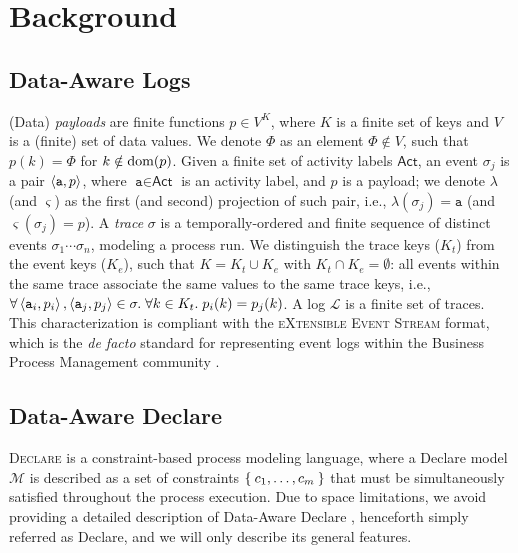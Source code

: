 \section{Background}

\subsection{Data-Aware Logs}
(Data) \textit{payloads} are finite functions $p\in V^K$, where $K$ is a finite set of keys and $V$ is a (finite) set of data values. We denote $\varPhi$ as an element $\varPhi\notin V$, such that $p(k)=\varPhi$ for $k\notin\textup{dom}(p)$. Given a finite set of activity labels $\textsf{Act}$, an event $\sigma_j$ is a pair $\Braket{\texttt{a},p}$, where $\texttt{a}\in\textsf{Act}$ is an activity label, and $p$ is a payload; we denote $\lambda$ (and $\varsigma$) as the first (and second) projection of such pair, i.e., $\lambda(\sigma_j)=\texttt{a}$ (and $\varsigma(\sigma_j)=p$). A \textit{trace} $\sigma$ is a temporally-ordered and finite sequence of distinct events $\sigma_1\cdots\sigma_n$, modeling a process run. We distinguish the trace keys ($K_t$) from the event keys ($K_e$), such that $K=K_t\cup K_e$ with $K_t\cap K_e=\emptyset$: all events within the same trace associate the same values to the same trace keys, i.e., $\forall \Braket{\texttt{a}_i,p_i},\Braket{\texttt{a}_j,p_j}\in\sigma.\;\forall k\in K_t.\; p_i(k)=p_j(k)$. A log $\mathcal{L}$ is a finite set of traces. This  characterization is compliant with the \textsc{eXtensible Event Stream} format, which is the \textit{de facto} standard for representing event logs within the Business Process Management community \cite{SchonigCMM16,LenoDM18}.


\subsection{Data-Aware Declare}\label{ssec:dad}
\textsc{Declare} is a constraint-based process modeling language, where a Declare model $\mathcal{M}$ is described as a set of constraints $\Set{c_1,\dots,c_m}$ that must be simultaneously satisfied throughout the process execution. Due to space limitations, we avoid providing a detailed description of Data-Aware Declare \cite{SchonigCMM16,LenoDM18}, henceforth simply referred as Declare, and we will only describe its general features.

